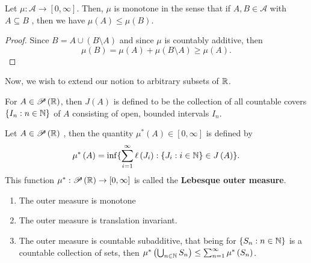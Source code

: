 \begin{proposition}
	Let \(\mu: \mathscr{A} \to \left[ 0, \infty \right]  \). Then, \( \mu\) is monotone in the sense that if \(A, B \in \mathscr{A}\) with \(A \subseteq B\) , then we have \( \mu\left( A \right)  \le \mu\left( B \right) \).
\end{proposition}
\begin{proof}
	Since \(B = A \cup \left( B \setminus A \right) \)	 and since \( \mu\) is countably additive, then \[
		\mu\left( B \right)  = \mu\left( A \right)  + \mu\left( B \setminus A \right) \ge \mu\left( A \right)
	.\]
\end{proof}
Now, we wish to extend our notion to arbitrary subsets of \(\mathbb{R}\).
\begin{Notation}
	For \(A \in \mathscr{P}\left( \mathbb{R} \right) \), then \(J\left( A \right) \) is defined to be the collection of all countable covers \(\{I_{n} : n \in \mathbb{N}\} \) of \(A\) consisting of open, bounded intervals \(I_{n}\).
\end{Notation}
\begin{definition}
	Let \(A \in \mathscr{P}\left( \mathbb{R} \right) \)	, then the quantity \( \mu^{*} \left( A \right)  \in \left[ 0, \infty \right] \) is defined by \[
		\mu^{*}\left( A \right) = \inf \{\sum_{i= 1}^{\infty} \ell\left( J_{i} \right) : \{J_{i} : i \in \mathbb{N}\} \in J\left( A \right)  \}
	.\]
	This function \( \mu^{*}: \mathscr{P}\left( \mathbb{R} \right)  \to \left[ 0, \infty \right] \) is called the \textbf{Lebesque outer measure}.
\end{definition}
\begin{lemma}
	\begin{enumerate}
		\item The outer measure is monotone
		\item The outer measure is translation invariant.
		\item The outer measure is countable subadditive, that being for \(\{S_{n} : n \in \mathbb{N}\} \) is a countable collection of sets, then \( \mu^{*}\left( \bigcup_{n \in \mathbb{N}} S_{n} \right) \le \sum_{n= 1}^{\infty} \mu^{*}\left( S_{n} \right) \).  \end{enumerate}
\end{lemma}

